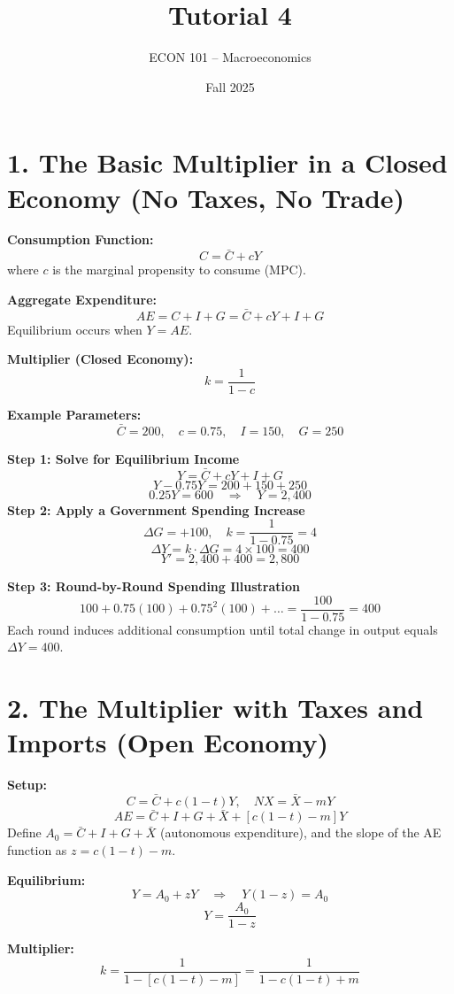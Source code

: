 \documentclass[12pt]{article}
\title{Tutorial 4}
\author{ECON 101 -- Macroeconomics}
\date{Fall 2025}
\begin{document}
\maketitle

\section*{1. The Basic Multiplier in a Closed Economy (No Taxes, No Trade)}

\textbf{Consumption Function:}
\[
C = \bar{C} + cY
\]
where \( c \) is the marginal propensity to consume (MPC).

\textbf{Aggregate Expenditure:}
\[
AE = C + I + G = \bar{C} + cY + I + G
\]
Equilibrium occurs when \( Y = AE \).

\textbf{Multiplier (Closed Economy):}
\[
k = \frac{1}{1 - c}
\]

\textbf{Example Parameters:}
\[
\bar{C} = 200, \quad c = 0.75, \quad I = 150, \quad G = 250
\]

\textbf{Step 1: Solve for Equilibrium Income}
\[
Y = \bar{C} + cY + I + G
\]
\[
Y - 0.75Y = 200 + 150 + 250
\]
\[
0.25Y = 600 \quad \Rightarrow \quad Y = \boxed{2{,}400}
\]
\newpage
\textbf{Step 2: Apply a Government Spending Increase}
\[
\Delta G = +100, \quad k = \frac{1}{1 - 0.75} = 4
\]
\[
\Delta Y = k \cdot \Delta G = 4 \times 100 = \boxed{400}
\]
\[
Y' = 2{,}400 + 400 = \boxed{2{,}800}
\]

\textbf{Step 3: Round-by-Round Spending Illustration}
\[
100 + 0.75(100) + 0.75^2(100) + \dots = \frac{100}{1 - 0.75} = 400
\]
Each round induces additional consumption until total change in output equals \( \Delta Y = 400 \).



\section*{2. The Multiplier with Taxes and Imports (Open Economy)}

\textbf{Setup:}
\[
C = \bar{C} + c(1-t)Y, \quad NX = \bar{X} - mY
\]
\[
AE = \bar{C} + I + G + \bar{X} + [c(1-t) - m]Y
\]
Define \( A_0 = \bar{C} + I + G + \bar{X} \) (autonomous expenditure), and the slope of the AE function as \( z = c(1-t) - m \).

\textbf{Equilibrium:}
\[
Y = A_0 + zY \quad \Rightarrow \quad Y(1 - z) = A_0
\]
\[
Y = \frac{A_0}{1 - z}
\]

\textbf{Multiplier:}
\[
k = \frac{1}{1 - [c(1-t) - m]} = \frac{1}{1 - c(1-t) + m}
\]
\end{document}
